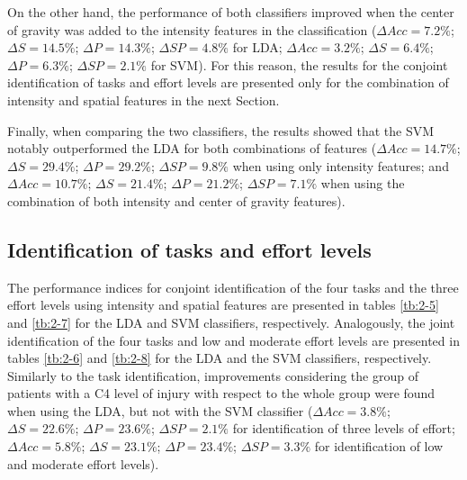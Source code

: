 On the other hand, the performance of both classifiers improved when the center of gravity was added to the intensity features in the classification ($\Delta Acc= 7.2\%$; $\Delta S= 14.5\%$; $\Delta P= 14.3\%$; $\Delta SP= 4.8\%$ for LDA; $\Delta Acc= 3.2\%$; $\Delta S= 6.4\%$; $\Delta P= 6.3\%$; $\Delta SP= 2.1\%$ for SVM). For this reason, the results for the conjoint identification of tasks and effort levels are presented only for the combination of intensity and spatial features in the next Section.

Finally, when comparing the two classifiers, the results showed that the SVM notably outperformed the LDA for both combinations of features ($\Delta Acc= 14.7\%$; $\Delta S= 29.4\%$; $\Delta P= 29.2\%$; $\Delta SP= 9.8\%$ when using only intensity features; and $\Delta Acc= 10.7\%$; $\Delta S= 21.4\%$; $\Delta P= 21.2\%$; $\Delta SP= 7.1\%$ when using the combination of both intensity and center of gravity features).


\subsection{Identification of tasks and effort levels}
The performance indices for conjoint identification of the four tasks and the three effort levels using intensity and spatial features are presented in tables \ref{tb:2-5} and \ref{tb:2-7} for the LDA and SVM classifiers, respectively. Analogously, the joint identification of the four tasks and low and moderate effort levels are presented in tables \ref{tb:2-6} and \ref{tb:2-8} for the LDA and the SVM classifiers, respectively.
Similarly to the task identification, improvements considering the group of patients with a C4 level of injury with respect to the whole group were found when using the LDA, but not with the SVM classifier ($\Delta Acc= 3.8\%$; $\Delta S= 22.6\%$; $\Delta P= 23.6\%$; $\Delta SP= 2.1\%$ for identification of three levels of effort; $\Delta Acc= 5.8\%$; $\Delta S= 23.1\%$; $\Delta P= 23.4\%$; $\Delta SP= 3.3\%$ for identification of low and moderate effort levels).

